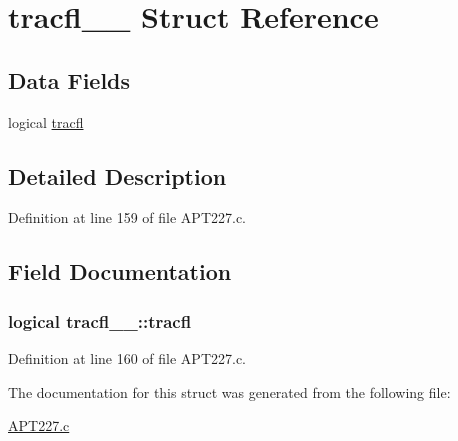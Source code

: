 \hypertarget{structtracfl__1__}{}\section{tracfl\+\_\+\_\+ Struct Reference}
\label{structtracfl__1__}
\subsection*{Data Fields}
\begin{DoxyCompactItemize}
\item 
logical \hyperlink{structtracfl__1___aafbb1c28260972bca30c692cc5a04106}{tracfl}
\end{DoxyCompactItemize}


\subsection{Detailed Description}


Definition at line 159 of file A\+P\+T227.\+c.



\subsection{Field Documentation}
\subsubsection[{\texorpdfstring{tracfl}{tracfl}}]{\setlength{\rightskip}{0pt plus 5cm}logical tracfl\+\_\+\_\+\+::tracfl}\hypertarget{structtracfl__1___aafbb1c28260972bca30c692cc5a04106}{}\label{structtracfl__1___aafbb1c28260972bca30c692cc5a04106}


Definition at line 160 of file A\+P\+T227.\+c.



The documentation for this struct was generated from the following file\+:\begin{DoxyCompactItemize}
\item 
\hyperlink{APT227_8c}{A\+P\+T227.\+c}\end{DoxyCompactItemize}
